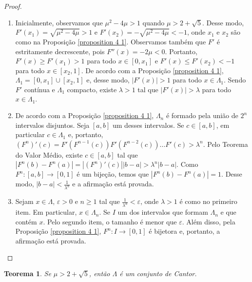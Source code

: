 \documentclass[a4paper, 12pt]{article}
\theoremstyle{definition}
\theoremstyle{plain}
\theoremstyle{plain}
\theoremstyle{plain}
\newtheorem{theorem}[definition]{Teorema}
\theoremstyle{definition}
\theoremstyle{remark}
\begin{document}
\begin{proof}
\begin{enumerate}
\item Inicialmente, observamos que $\mu^2 - 4\mu > 1$ quando $\mu > 2 + \sqrt{5}$. Desse modo, $F'(x_1) = \sqrt{\mu^2 - 4\mu} > 1$ e $F'(x_2) = -\sqrt{\mu^2 - 4\mu} < -1$, onde $x_1$ e $x_2$ são como na Proposição \ref{proposition 4 1}. Observamos também que $F'$ é estritamente decrescente, pois $F''(x) = -2\mu < 0$.  Portanto, $F'(x) \geq F'(x_1) > 1$ para todo $x \in [0, x_1]$ e $F'(x) \leq F'(x_2) < -1$ para todo $x \in [x_2, 1]$. De acordo com a Proposição \ref{proposition 4 1}, $\Lambda_1 = [0, x_1] \cup [x_2, 1]$ e, desse modo, $|F'(x)| > 1$ para todo $x \in \Lambda_1$. Sendo $F'$ contínua e $\Lambda_1$ compacto, existe $\lambda > 1$ tal que $|F'(x)| > \lambda$ para todo $x \in \Lambda_1$.

\item De acordo com a Proposição \ref{proposition 4 1}, $\Lambda_n$ é formado pela união de $2^n$ intervalos disjuntos. Seja $[a, b]$ um desses intervalos. Se $c \in [a, b]$, em particular $c \in \Lambda_1$ e, portanto, $(F^n)'(c) = F'(F^{n-1}(c)) F'(F^{n-2}(c)) \dots F'(c) > \lambda^n$. Pelo Teorema do Valor Médio, existe $c \in [a, b]$ tal que $|F^n(b) - F^n(a)| = |(F^n)'(c)||b - a| > \lambda^n|b - a|$. Como $F^n: [a, b] \to [0 ,1]$ é um bijeção, temos que $|F^n(b) - F^n(a)| = 1$. Desse modo, $|b - a| < \frac{1}{\lambda^n}$ e a afirmação está provada.

\item  Sejam $x \in \Lambda$, $\varepsilon > 0$ e $n \geq 1$ tal que $\frac{1}{\lambda^n} < \varepsilon$, onde $\lambda > 1$ é como no primeiro item. Em particular, $x \in \Lambda_n$. Se $I$ um dos intervalos que formam $\Lambda_n$ e que contém $x$. Pelo segundo item, o tamanho é menor que $\varepsilon$. Além disso, pela Proposição \ref{proposition 4 1}, $F^n: I \to [0,1]$ é bijetora e, portanto, a afirmação está provada.
\end{enumerate}
\end{proof} 

\begin{theorem}
\label{theorem 4 1}
Se $\mu > 2 + \sqrt{5}$, então $\Lambda$ é um conjunto de Cantor.
\end{theorem}
\end{document}
